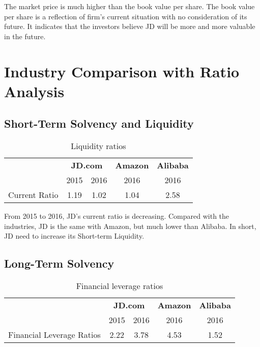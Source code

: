 The market price is much higher than the book value per share. The book value per share is a reflection of firm’s current situation with no consideration of its future. It indicates that the investors believe JD will be more and more valuable in the future.


\section{Industry Comparison with Ratio Analysis }

\subsection{Short-Term Solvency and Liquidity}

\begin{table}[H]	
	\begin{center}
		\begin{tabular}{p{5.6cm}cccc}
			\toprule 
			& \multicolumn{2}{c}{\textbf{JD.com}} & \multicolumn{1}{c}{\textbf{Amazon}}&\multicolumn{1}{c}{\textbf{Alibaba}}\\\cmidrule(lr){2-3} 
			\multirow{-2}{*}{} &\multicolumn{1}{c}{2015}&2016&\multicolumn{1}{c}{2016}&\multicolumn{1}{c}{2016}\\
			\midrule	
			Current Ratio&	1.19&	1.02&	1.04&	2.58\\
			\bottomrule
		\end{tabular}
	\end{center}
	\caption{Liquidity ratios}\label{table:1}
\end{table}

From 2015 to 2016, JD’s current ratio is decreasing. Compared with the industries, JD is the same with Amazon, but much lower than Alibaba. In short, JD need to increase its Short-term Liquidity.

\subsection{Long-Term Solvency}

\begin{table}[H]	
	\begin{center}
		\begin{tabular}{p{5.6cm}cccc}
			\toprule 
			& \multicolumn{2}{c}{\textbf{JD.com}} & \multicolumn{1}{c}{\textbf{Amazon}}&\multicolumn{1}{c}{\textbf{Alibaba}}\\\cmidrule(lr){2-3} 
			\multirow{-2}{*}{} &\multicolumn{1}{c}{2015}&2016&\multicolumn{1}{c}{2016}&\multicolumn{1}{c}{2016}\\
			\midrule	
			Financial Leverage Ratios&2.22&	3.78&	4.53&1.52\\
			\bottomrule
		\end{tabular}
	\end{center}
	\caption{Financial leverage ratios}\label{table:1}
\end{table}

